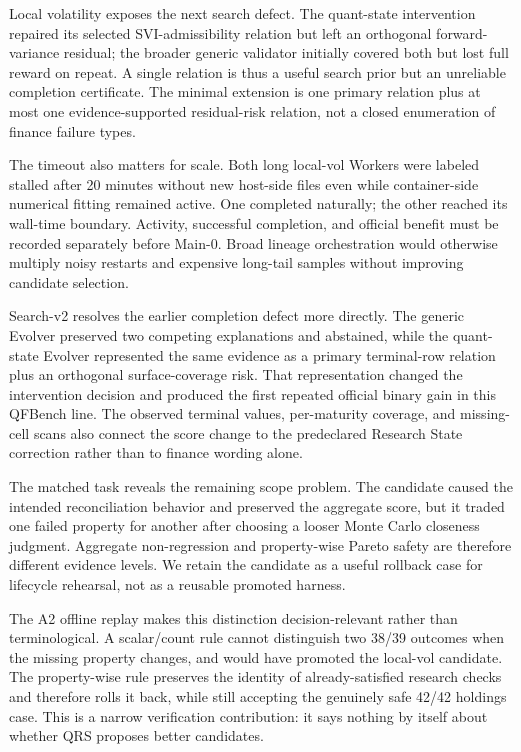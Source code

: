 Local volatility exposes the next search defect. The quant-state intervention
repaired its selected SVI-admissibility relation but left an orthogonal
forward-variance residual; the broader generic validator initially covered
both but lost full reward on repeat. A single relation is thus a useful search
prior but an unreliable completion certificate. The minimal extension is one
primary relation plus at most one evidence-supported residual-risk relation,
not a closed enumeration of finance failure types.

The timeout also matters for scale. Both long local-vol Workers were labeled
stalled after 20 minutes without new host-side files even while container-side
numerical fitting remained active. One completed naturally; the other reached
its wall-time boundary. Activity, successful completion, and official benefit
must be recorded separately before Main-0. Broad lineage orchestration would
otherwise multiply noisy restarts and expensive long-tail samples without
improving candidate selection.

Search-v2 resolves the earlier completion defect more directly. The generic
Evolver preserved two competing explanations and abstained, while the
quant-state Evolver represented the same evidence as a primary terminal-row
relation plus an orthogonal surface-coverage risk. That representation changed
the intervention decision and produced the first repeated official binary gain
in this QFBench line. The observed terminal values, per-maturity coverage, and
missing-cell scans also connect the score change to the predeclared Research
State correction rather than to finance wording alone.

The matched task reveals the remaining scope problem. The candidate caused the
intended reconciliation behavior and preserved the aggregate score, but it
traded one failed property for another after choosing a looser Monte Carlo
closeness judgment. Aggregate non-regression and property-wise Pareto safety
are therefore different evidence levels. We retain the candidate as a useful
rollback case for lifecycle rehearsal, not as a reusable promoted harness.

The A2 offline replay makes this distinction decision-relevant rather than
terminological. A scalar/count rule cannot distinguish two 38/39 outcomes when
the missing property changes, and would have promoted the local-vol candidate.
The property-wise rule preserves the identity of already-satisfied research
checks and therefore rolls it back, while still accepting the genuinely safe
42/42 holdings case. This is a narrow verification contribution: it says
nothing by itself about whether QRS proposes better candidates.

